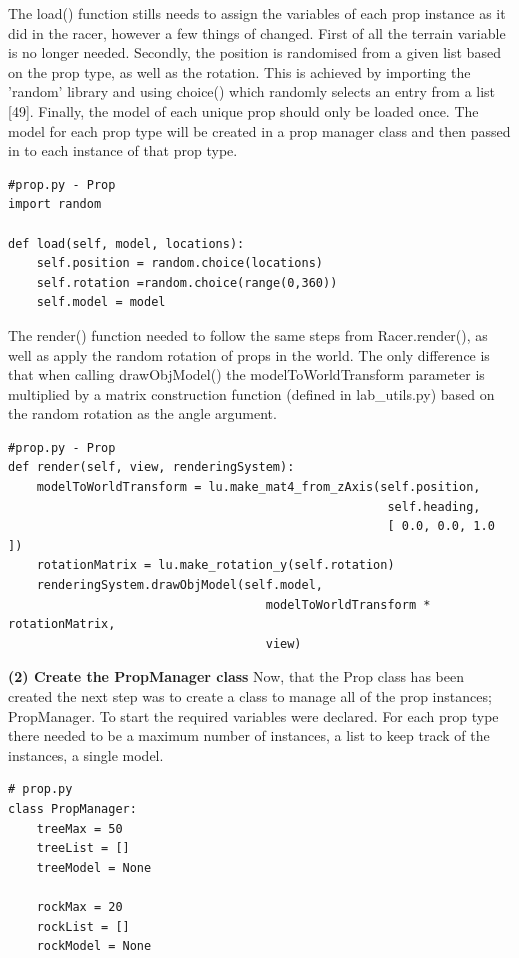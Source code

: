 \documentclass[a4 paper, 12pt]{article}
\begin{document}
The load() function stills needs to assign the variables of each prop instance as it did in the racer, however a few things of changed. First of all the terrain variable is no longer needed. Secondly, the position is randomised from a given list based on the prop type, as well as the rotation. This is achieved by importing the 'random' library and using choice() which randomly selects an entry from a list [49]. Finally, the model of each unique prop should only be loaded once. The model for each prop type will be created in a prop manager class and then passed in to each instance of that prop type.
    \begin{lstlisting}
#prop.py - Prop
import random

def load(self, model, locations):      
    self.position = random.choice(locations)
    self.rotation =random.choice(range(0,360))
    self.model = model
    \end{lstlisting}

The render() function needed to follow the same steps from Racer.render(), as well as apply the random rotation of props in the world. The only difference is that when calling drawObjModel() the modelToWorldTransform parameter is multiplied by a matrix construction function (defined in lab\_utils.py) based on the random rotation as the angle argument. 
    \begin{lstlisting}
#prop.py - Prop
def render(self, view, renderingSystem):
    modelToWorldTransform = lu.make_mat4_from_zAxis(self.position,
                                                     self.heading, 
                                                     [ 0.0, 0.0, 1.0 ])
    rotationMatrix = lu.make_rotation_y(self.rotation)
    renderingSystem.drawObjModel(self.model, 
                                    modelToWorldTransform * rotationMatrix, 
                                    view)
    \end{lstlisting}
 
\textbf{(2) Create the PropManager class}
Now, that the Prop class has been created the next step was to create a class to manage all of the prop instances; PropManager. To start the required variables were declared. For each prop type there needed to be a maximum number of instances, a list to keep track of the instances, a single model.
    \begin{lstlisting}
# prop.py
class PropManager: 
    treeMax = 50
    treeList = []
    treeModel = None

    rockMax = 20
    rockList = []
    rockModel = None
    \end{lstlisting} 
\end{document}
